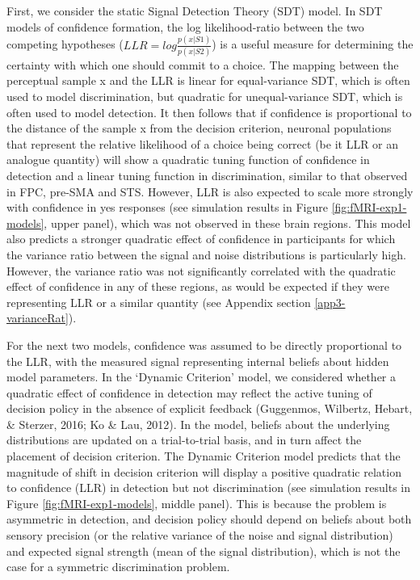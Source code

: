 \documentclass[12pt,twoside]{reedthesis}
\begin{document}
First, we consider the static Signal Detection Theory (SDT) model. In SDT models of confidence formation, the log likelihood-ratio between the two competing hypotheses (\(LLR=log\frac{p(x|S1)}{p(x|S2)}\)) is a useful measure for determining the certainty with which one should commit to a choice. The mapping between the perceptual sample x and the LLR is linear for equal-variance SDT, which is often used to model discrimination, but quadratic for unequal-variance SDT, which is often used to model detection. It then follows that if confidence is proportional to the distance of the sample x from the decision criterion, neuronal populations that represent the relative likelihood of a choice being correct (be it LLR or an analogue quantity) will show a quadratic tuning function of confidence in detection and a linear tuning function in discrimination, similar to that observed in FPC, pre-SMA and STS. However, LLR is also expected to scale more strongly with confidence in yes responses (see simulation results in Figure \ref{fig:fMRI-exp1-models}, upper panel), which was not observed in these brain regions. This model also predicts a stronger quadratic effect of confidence in participants for which the variance ratio between the signal and noise distributions is particularly high. However, the variance ratio was not significantly correlated with the quadratic effect of confidence in any of these regions, as would be expected if they were representing LLR or a similar quantity (see Appendix section \ref{app3-varianceRat}).

For the next two models, confidence was assumed to be directly proportional to the LLR, with the measured signal representing internal beliefs about hidden model parameters. In the `Dynamic Criterion' model, we considered whether a quadratic effect of confidence in detection may reflect the active tuning of decision policy in the absence of explicit feedback (Guggenmos, Wilbertz, Hebart, \& Sterzer, 2016; Ko \& Lau, 2012). In the model, beliefs about the underlying distributions are updated on a trial-to-trial basis, and in turn affect the placement of decision criterion. The Dynamic Criterion model predicts that the magnitude of shift in decision criterion will display a positive quadratic relation to confidence (LLR) in detection but not discrimination (see simulation results in Figure \ref{fig:fMRI-exp1-models}, middle panel). This is because the problem is asymmetric in detection, and decision policy should depend on beliefs about both sensory precision (or the relative variance of the noise and signal distribution) and expected signal strength (mean of the signal distribution), which is not the case for a symmetric discrimination problem.
\end{document}
